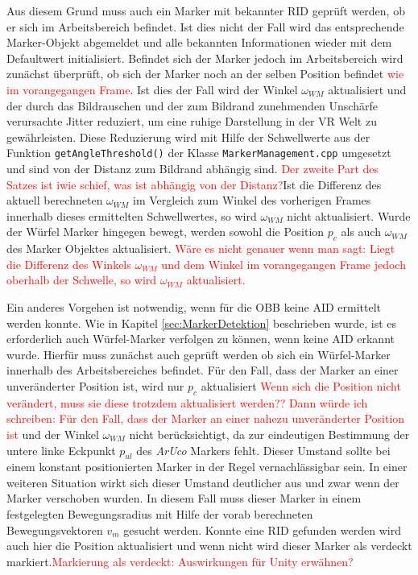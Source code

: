Aus diesem Grund muss auch ein Marker mit bekannter RID geprüft werden, ob er sich im Arbeitsbereich befindet. Ist dies nicht der Fall wird das entsprechende Marker-Objekt abgemeldet und alle bekannten Informationen wieder mit dem Defaultwert initialisiert. Befindet sich der Marker jedoch im Arbeitsbereich wird zunächst überprüft, ob sich der Marker noch an der selben Position befindet \textcolor{red}{wie im vorangegangen Frame}. Ist dies der Fall wird der Winkel $\omega_{WM}$ aktualisiert und der durch das Bildrauschen und der zum Bildrand zunehmenden Unschärfe verursachte Jitter reduziert, um eine ruhige Darstellung in der VR Welt zu gewährleisten. Diese Reduzierung wird mit Hilfe der Schwellwerte aus der Funktion \texttt{get\-Angle\-Threshold()} der Klasse \texttt{MarkerManagement.cpp} umgesetzt und sind von der Distanz zum Bildrand abhängig sind. \textcolor{red}{Der zweite Part des Satzes ist iwie schief, was ist abhängig von der Distanz?}Ist die Differenz des aktuell berechneten $\omega_{WM}$ im Vergleich zum Winkel des vorherigen Frames innerhalb dieses ermittelten Schwellwertes, so wird $\omega_{WM}$ nicht aktualisiert. Wurde der Würfel Marker hingegen bewegt, werden sowohl die Position $p_c$ als auch $\omega_{WM}$ des Marker Objektes aktualisiert. \textcolor{red}{Wäre es nicht genauer wenn man sagt: Liegt die Differenz des Winkels $\omega_{WM}$ und dem Winkel im vorangegangen Frame jedoch oberhalb der Schwelle, so wird $\omega_{WM}$ aktualisiert.}

Ein anderes Vorgehen ist notwendig, wenn für die OBB keine AID ermittelt werden konnte. Wie in Kapitel \ref{sec:MarkerDetektion} beschrieben wurde, ist es erforderlich auch Würfel-Marker verfolgen zu können, wenn keine AID erkannt wurde. Hierfür muss zunächst auch geprüft werden ob sich ein Würfel-Marker innerhalb des Arbeitsbereiches befindet. Für den Fall, dass der Marker an einer unveränderter Position ist, wird nur $p_c$  aktualisiert \textcolor{red}{Wenn sich die Position nicht verändert, muss sie diese trotzdem aktualisiert werden?? Dann würde ich schreiben: Für den Fall, dass der Marker an einer nahezu unveränderter Position ist }und der Winkel $\omega_{WM}$ nicht berücksichtigt, da zur eindeutigen Bestimmung der untere linke Eckpunkt $p_{ul}$ des \textit{ArUco} Markers fehlt. Dieser Umstand sollte bei einem konstant positionierten Marker in der Regel vernachlässigbar sein. In einer weiteren Situation wirkt sich dieser Umstand deutlicher aus und zwar wenn der Marker verschoben wurden. In diesem Fall muss dieser Marker in einem festgelegten Bewegungsradius mit Hilfe der vorab berechneten Bewegungsvektoren $v_m$ gesucht werden. Konnte eine RID gefunden werden wird auch hier die Position aktualisiert und wenn nicht wird dieser Marker als verdeckt markiert.\textcolor{red}{Markierung als verdeckt: Auswirkungen für Unity erwähnen?} 

